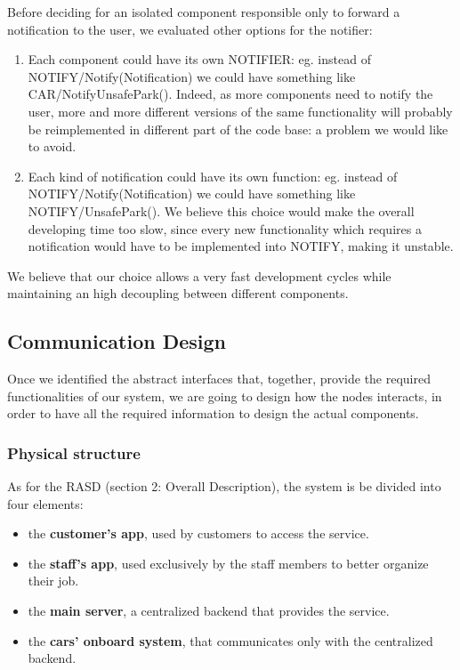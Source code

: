 \documentclass[11pt]{article} %
\begin{document}
Before deciding for an isolated component responsible only to forward a notification to the user, we evaluated other options for the notifier:

\begin{enumerate}
	\item Each component could have its own NOTIFIER: eg. instead of NOTIFY/Notify(Notification) we could have something like CAR/NotifyUnsafePark(). Indeed, as more components need to notify the user, more and more different versions of the same functionality will probably be reimplemented in different part of the code base: a problem we would like to avoid.
	\item Each kind of notification could have its own function: eg. instead of NOTIFY/Notify(Notification) we could have something like NOTIFY/UnsafePark(). We believe this choice would make the overall developing time too slow, since every new functionality which requires a notification would have to be implemented into NOTIFY, making it unstable.
\end{enumerate}

We believe that our choice allows a very fast development cycles while maintaining an high decoupling between different components.




\subsection{Communication Design}

Once we identified the abstract interfaces that, together, provide the required functionalities of our system, we are going to design how the nodes interacts, in order to have all the required information to design the actual components.

\subsubsection{Physical structure}

As for the RASD (section 2: Overall Description), the system is be divided into four elements:
\begin{itemize}[noitemsep]
	\item the \textbf{customer's app}, used by customers to access the service.
	\item the \textbf{staff's app}, used exclusively by the staff members to better organize their job.
	\item the \textbf{main server}, a centralized backend that provides the service.
	\item the \textbf{cars’ onboard system}, that communicates only with the centralized backend.
\end{itemize}
\end{document}

